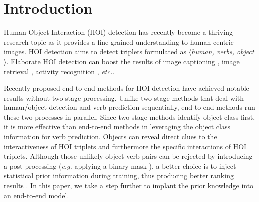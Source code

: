 \documentclass[letterpaper]{article} %
\begin{document}
\begin{abstract}

 
\end{abstract}



\section{Introduction}
Human Object Interaction (HOI) detection has recently become a thriving research topic as it provides a fine-grained understanding to human-centric images. HOI detection aims to detect triplets formulated as $\langle$\textit{human, verbs, object}$\rangle$. Elaborate HOI detection can boost the results of image captioning \cite{yao2018exploringVR}, image retrieval \cite{johnson2015imageRt}, activity recognition \cite{yuan2021DIN}, \textit{etc.}.



Recently proposed end-to-end methods \cite{liao2020ppdm,kim2021hotr,tamura2021qpic} for HOI detection have achieved notable results without two-stage processing. Unlike two-stage methods that deal with human/object detection and verb prediction sequentially, end-to-end methods run these two processes in parallel. Since two-stage methods identify object class first, it is more effective than end-to-end methods in leveraging the object class information for verb prediction. Objects can reveal direct clues to the interactiveness of HOI triplets \cite{li2019interactiveness} and furthermore the specific interactions of HOI triplets. Although those unlikely object-verb pairs can be rejected by introducing a post-processing (\textit{e.g.} applying a binary mask \cite{tamura2021qpic}), a better choice is to inject statistical prior information during training, thus producing better ranking results \cite{chen2019KERN}. In this paper, we take a step further to implant the prior knowledge into an end-to-end model.

\end{document}
